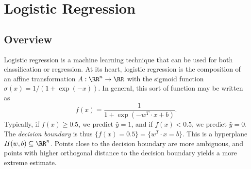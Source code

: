 \section{Logistic Regression}
\label{sec:logit}

\subsection{Overview}
\label{sec:logit-overview}

Logistic regression is a machine learning technique that can be used for both classification or regression. At its heart, logistic regression is the composition of an affine transformation $A: \RR^n \to \RR$ with the sigmoid function $\sigma(x) = 1/(1+ \exp(-x))$. In general, this sort of function may be written as 
\begin{equation}
    f(x) = \frac{1}{1 + \exp(-w^T\cdot x + b)}.
\end{equation}
Typically, if $f(x) \geq 0.5$, we predict $\hat y = 1$, and if $f(x) < 0.5$, we predict $\hat y = 0$. The \emph{decision boundary} is thus $\{f(x) = 0.5\} = \{w^T \cdot x = b \}$. This is a hyperplane $H(w,b) \subseteq \RR^n$. Points close to the decision boundary are more ambiguous, and points with higher orthogonal distance to the decision boundary yields a more extreme estimate.

